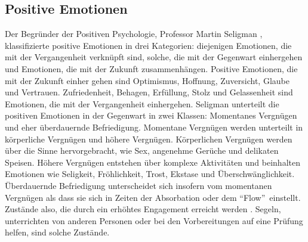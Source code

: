 \subsection{Positive Emotionen}\label{subsec.swbPosEmotion}
Der Begründer der Positiven Psychologie, Professor Martin Seligman \citeyear{Seligman:2002}, klassifizierte positive Emotionen in drei Kategorien: diejenigen Emotionen, die mit der Vergangenheit verknüpft sind, solche, die mit der Gegenwart einhergehen und Emotionen, die mit der Zukunft zusammenhängen. Positive Emotionen, die mit der Zukunft einher gehen sind Optimismus, Hoffnung, Zuversicht, Glaube und Vertrauen. Zufriedenheit, Behagen, Erfüllung, Stolz und Gelassenheit sind Emotionen, die mit der Vergangenheit einhergehen. Seligman unterteilt die positiven Emotionen in der Gegenwart in zwei Klassen: Momentanes Vergnügen und eher überdauernde Befriedigung. Momentane Vergnügen werden unterteilt in körperliche Vergnügen und höhere Vergnügen. Körperlichen Vergnügen werden über die Sinne hervorgebracht, wie Sex, angenehme Gerüche und delikaten Speisen. Höhere Vergnügen entstehen über komplexe Aktivitäten und beinhalten Emotionen wie Seligkeit, Fröhlichkeit, Trost, Ekstase und Überschwänglichkeit. Überdauernde Befriedigung unterscheidet sich insofern vom momentanen Vergnügen als dass sie sich in Zeiten der Absorbation oder dem \textquotedblleft Flow\textquotedblright \ einstellt. Zustände also, die durch ein erhöhtes Engagement erreicht werden \cite{Carr:2011}. Segeln, unterrichten von anderen Personen oder bei den Vorbereitungen auf eine Prüfung helfen, sind solche Zustände. 

